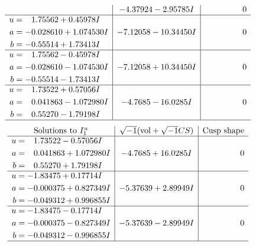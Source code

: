 \documentclass[1p]{elsarticle_modified}
\theoremstyle{definition}
\newcommand{\I}{\sqrt{-1}}
\begin{document}
$$\begin{array}{c|c|c}
 & -4.37924 - 2.95785 I & \phantom{-0.000000 } 0 \\ \hline\begin{aligned}
u &= \phantom{-}1.75562 + 0.45978 I \\
a &= -0.028610 + 1.074530 I \\
b &= -0.55514 + 1.73413 I\end{aligned}
 & -7.12058 - 10.34450 I & \phantom{-0.000000 } 0 \\ \hline\begin{aligned}
u &= \phantom{-}1.75562 - 0.45978 I \\
a &= -0.028610 - 1.074530 I \\
b &= -0.55514 - 1.73413 I\end{aligned}
 & -7.12058 + 10.34450 I & \phantom{-0.000000 } 0 \\ \hline\begin{aligned}
u &= \phantom{-}1.73522 + 0.57056 I \\
a &= \phantom{-}0.041863 - 1.072980 I \\
b &= \phantom{-}0.55270 - 1.79198 I\end{aligned}
 & -4.7685 - 16.0285 I & \phantom{-0.000000 } 0\\
 \hline 
 \end{array}$$\newpage$$\begin{array}{c|c|c}  
\text{Solutions to }I^u_{1}& \I (\text{vol} + \sqrt{-1}CS) & \text{Cusp shape}\\
 \hline 
\begin{aligned}
u &= \phantom{-}1.73522 - 0.57056 I \\
a &= \phantom{-}0.041863 + 1.072980 I \\
b &= \phantom{-}0.55270 + 1.79198 I\end{aligned}
 & -4.7685 + 16.0285 I & \phantom{-0.000000 } 0 \\ \hline\begin{aligned}
u &= -1.83475 + 0.17714 I \\
a &= -0.000375 + 0.827349 I \\
b &= -0.049312 + 0.996855 I\end{aligned}
 & -5.37639 + 2.89949 I & \phantom{-0.000000 } 0 \\ \hline\begin{aligned}
u &= -1.83475 - 0.17714 I \\
a &= -0.000375 - 0.827349 I \\
b &= -0.049312 - 0.996855 I\end{aligned}
 & -5.37639 - 2.89949 I & \phantom{-0.000000 } 0\\
 \hline 
 \end{array}$$\newpage\newpage\renewcommand{\arraystretch}{1}
\end{document}
